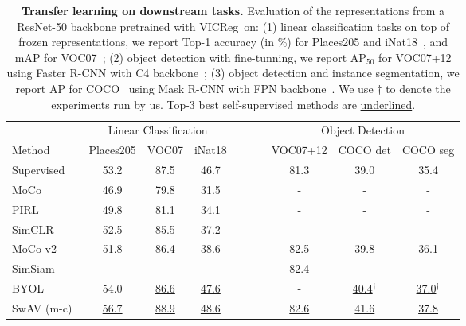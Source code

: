 \documentclass{article}
\newcommand{\algo}{VICReg}
\begin{document}
\begin{table}[t]
\centering
    \caption{\textbf{Transfer learning on downstream tasks.} Evaluation of the representations from a ResNet-50 backbone pretrained with \algo \ on: (1) linear classification tasks on top of frozen representations, we report Top-1 accuracy (in \%) for Places205 \cite{zhou2014places} and iNat18~\cite{vanhorni2018naturalist}, and mAP for VOC07~\cite{everingham2010voc}; (2) object detection with fine-tunning, we report AP$_{50}$ for VOC07+12 using Faster R-CNN with C4 backbone~\cite{ren2015fasterrcnn}; (3) object detection and instance segmentation, we report AP for COCO~\cite{lin2014coco} using Mask R-CNN with FPN backbone~\cite{he2017maskrcnn}. We use ${\dagger}$ to denote the experiments run by us. Top-3 best self-supervised methods are \underline{underlined}.}
    \label{tab:transfer_learning}
    \vspace{-0.5em}
  \setlength{\tabcolsep}{2.0pt}
    \begin{tabular}{ @{} l ccc c ccc @{} }
      \toprule
       & \multicolumn{3}{c}{Linear Classification} &~~~~& \multicolumn{3}{c}{Object Detection}\\
\cmidrule{2-4}\cmidrule{6-8}
	   Method  & Places205 & VOC07 & iNat18 && VOC07+12 & COCO det & COCO seg \\
      \midrule
	    Supervised                          & 53.2  & 87.5 & 46.7 && 81.3 & 39.0 & 35.4 \\
      \midrule
	    MoCo~\cite{he2020moco}              & 46.9 & 79.8 & 31.5 && - & - & - \\
	    PIRL~\cite{misra2020pirl}           & 49.8 & 81.1 & 34.1 && - & - & - \\
	    SimCLR~\cite{chen2020simclr}        & 52.5 & 85.5 & 37.2 && - & - & -\\
	    MoCo v2~\cite{chen2020mocov2}       & 51.8 & 86.4 & 38.6 && 82.5 & 39.8 & 36.1 \\
	    SimSiam~\cite{chen2020simsiam}      & -      & -      & -      && 82.4 & - & - \\
	    BYOL~\cite{grill2020byol}           & 54.0 & \underline{86.6} & \underline{47.6} && - & \hspace{0.41em}\underline{40.4}$^{\dagger}$ & \hspace{0.41em}\underline{37.0}$^{\dagger}$ \\
	    SwAV (m-c)~\cite{caron2020swav}           & \underline{56.7} & \underline{88.9} & \underline{48.6} && \underline{82.6} & \underline{41.6} & \underline{37.8} \\

\end{tabular}
\end{table}
\end{document}
